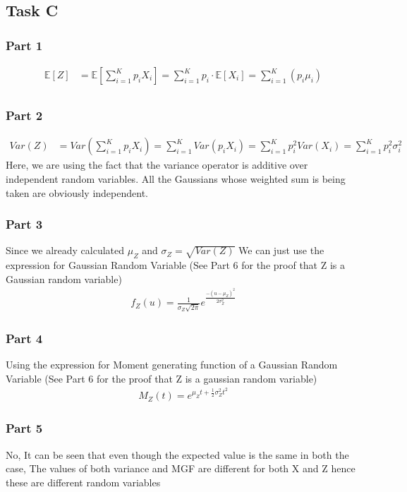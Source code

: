 \subsection{Task C}
\subsubsection{Part 1}
    \begin{align*}
        \mathbb{E}[Z]&=\mathbb{E}\left[ \sum_{i=1}^K p_iX_i\right]=\sum_{i=1}^K p_i \cdot \mathbb{E}\left[ X_i\right]=\sum_{i=1}^{K} \left(p_i\mu_i\right)\\
    \end{align*}

\subsubsection{Part 2}
    \begin{align*}
        Var(Z)&=Var\left(\sum_{i=1}^K p_iX_i\right)=\sum_{i=1}^K Var\left(p_iX_i\right)=\sum_{i=1}^K p_i^2Var\left(X_i\right)=\sum_{i=1}^K p_i^2\sigma_i^2
    \end{align*}
    Here, we are using the fact that the variance operator is additive over independent random variables. All the Gaussians whose weighted sum is being taken are obviously independent.\\
\subsubsection{Part 3}
    Since we already calculated $\mu_Z$ and $\sigma_Z = \sqrt{Var(Z)}$ We can just use the expression for Gaussian Random Variable (See Part 6 for the proof that Z is a Gaussian random variable)
    \begin{align*}
        f_Z(u)=\frac{1}{\sigma_Z\sqrt{2\pi}}e^{\frac{-\left(u-\mu_Z\right)^2}{2\sigma_Z^2}}
    \end{align*}
\subsubsection{Part 4}
    Using the expression for Moment generating function of a Gaussian Random Variable (See Part 6 for the proof that Z is a gaussian random variable)
    \begin{align*}
        M_Z(t) = e^{\mu_Z t +\frac{1}{2}\sigma_Z^2t^2}
    \end{align*}
\subsubsection{Part 5}
    No, It can be seen that even though the expected value is the same in both the case, The values of both variance and MGF are different for both X and Z hence these are different random variables
